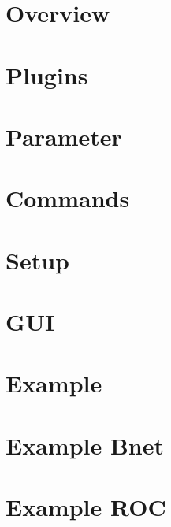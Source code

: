 
\chapter{Overview}
 \cleardoublepage
\chapter{Plugins}
 \cleardoublepage
\chapter{Parameter}
 \cleardoublepage
\chapter{Commands}
 \cleardoublepage
\chapter{Setup}
 \cleardoublepage
\chapter{GUI}
 \cleardoublepage
\chapter{Example \mbs}
 \cleardoublepage
\chapter{Example Bnet}
 \cleardoublepage
\chapter{Example ROC}
 \cleardoublepage


